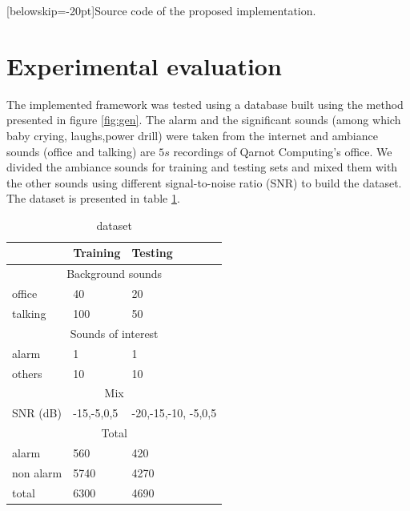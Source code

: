 \documentclass[10pt, conference, compsocconf]{IEEEtran}
\begin{document}
\begin{mdframed}[backgroundcolor=LightGray,topline=false, bottomline=false,leftline=false, rightline=false]
\inputminted[baselinestretch=1, fontsize=\scriptsize]{python}{selection.py}
\end{mdframed}
[belowskip=-20pt]{Source code of the proposed implementation.}
\label{fig:implementation_code}
\section{Experimental evaluation} \label{Proof-of-concept}
The implemented framework was tested using a database built using the method presented in figure \ref{fig:gen}. The alarm and the significant sounds (among which baby crying, laughs,power drill) were taken from the internet and ambiance sounds (office and talking) are $5s$ recordings of Qarnot Computing's office. We divided the ambiance sounds for training and testing sets and mixed them with the other sounds using different signal-to-noise ratio (SNR) to build the dataset. The dataset is presented in table \ref{table:dataset}.
\begin{table}[h]
  \centering
  \begin{tabular}{|*{3}{l|}}
    \hline
    & Training & Testing \\
    \hline
    \multicolumn{3}{|c|}{Background sounds} \\
    \hline
    office & 40 & 20\\
    talking & 100 & 50 \\
    \hline
    \multicolumn{3}{|c|}{Sounds of interest} \\
    \hline
    alarm & 1 & 1 \\
    others & 10 & 10 \\
    \hline
    \multicolumn{3}{|c|}{Mix} \\
    \hline
    SNR (dB)& -15,-5,0,5 & -20,-15,-10, -5,0,5 \\
    \hline
    \multicolumn{3}{|c|}{Total} \\ 
    \hline
    alarm & 560 & 420 \\
    non alarm & 5740 & 4270 \\
    total & 6300 & 4690 \\
   \hline
  \end{tabular}
\caption{dataset \label{table:dataset}}
\end{table}
\end{document}
